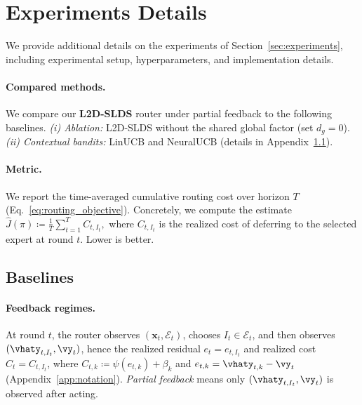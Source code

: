 \section{Experiments Details}
\label{sec:experiments-details}

We provide additional details on the experiments of Section~\ref{sec:experiments}, including
experimental setup, hyperparameters, and implementation details.

\paragraph{Compared methods.}
We compare our \textbf{L2D-SLDS} router under partial feedback to the following baselines.
\emph{(i) Ablation:} L2D-SLDS without the shared global factor (set \(d_g=0\)).
\emph{(ii) Contextual bandits:} LinUCB \citep{li2010contextual} and NeuralUCB
\citep{zhou2020neuralcontextualbanditsucbbased} (details in Appendix~\ref{subsection:baselines}).

\paragraph{Metric.}
We report the time-averaged cumulative routing cost over horizon \(T\) (Eq.~\eqref{eq:routing_objective}). Concretely, we
compute the estimate
\(
\hat{J}(\pi) \coloneqq \frac{1}{T}\sum_{t=1}^T C_{t,I_t},
\)
where \(C_{t,I_t}\) is the realized cost of deferring to the selected expert at round \(t\). Lower is better.

\subsection{Baselines} \label{subsection:baselines}

\paragraph{Feedback regimes.}
At round \(t\), the router observes \((\mathbf{x}_t,\mathcal{E}_t)\), chooses \(I_t\in\mathcal{E}_t\),
and then observes \((\vhaty_{t,I_t},\vy_t)\), hence the realized residual \(e_t=e_{t,I_t}\) and realized
cost \(C_t=C_{t,I_t}\), where \(C_{t,k}\coloneqq \psi(e_{t,k})+\beta_k\) and
\(e_{t,k}=\vhaty_{t,k}-\vy_t\) (Appendix~\ref{app:notation}).
\emph{Partial feedback} means only \((\vhaty_{t,I_t},\vy_t)\) is observed after acting.

